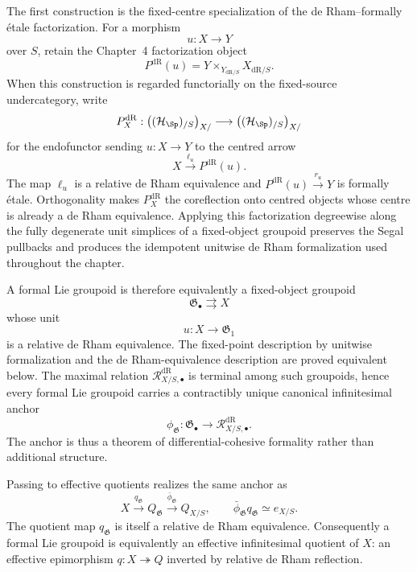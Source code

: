 The first construction is the fixed-centre specialization of the
de Rham--formally \'etale factorization.  For a morphism
\[
    u:X\longrightarrow Y
\]
over $S$, retain the Chapter~4 factorization object
\[
    P^{\mathrm{dR}}(u)
    =
    Y\times_{Y_{\mathrm{dR}/S}}X_{\mathrm{dR}/S}.
\]
When this construction is regarded functorially on the fixed-source
undercategory, write
\[
    P_X^{\mathrm{dR}}:
    \bigl((\mathcal H_{\Sp})_{/S}\bigr)_{X/}
    \longrightarrow
    \bigl((\mathcal H_{\Sp})_{/S}\bigr)_{X/}
\]
for the endofunctor sending \(u:X\to Y\) to the centred arrow
\[
    X\xrightarrow{\ell_u}P^{\mathrm{dR}}(u).
\]
The map \(\ell_u\) is a relative de Rham equivalence and
\(P^{\mathrm{dR}}(u)\xrightarrow{r_u}Y\) is formally
\'etale.  Orthogonality makes $P_X^{\mathrm{dR}}$ the
coreflection onto centred objects whose centre is already a de Rham
equivalence.  Applying this factorization degreewise along the fully
degenerate unit simplices of a fixed-object groupoid preserves the Segal
pullbacks and produces the idempotent unitwise de Rham formalization used
throughout the chapter.

A formal Lie groupoid is therefore equivalently a fixed-object groupoid
\[
    \mathfrak G_\bullet\rightrightarrows X
\]
whose unit
\[
    u:X\longrightarrow\mathfrak G_1
\]
is a relative de Rham equivalence.  The fixed-point description by unitwise
formalization and the de Rham-equivalence description are proved equivalent
below.  The maximal relation
$\mathcal R^{\mathrm{dR}}_{X/S,\bullet}$ is terminal among such groupoids, hence every
formal Lie groupoid carries a contractibly unique canonical infinitesimal
anchor
\[
    \phi_{\mathfrak G}:
    \mathfrak G_\bullet
    \longrightarrow
    \mathcal R^{\mathrm{dR}}_{X/S,\bullet}.
\]
The anchor is thus a theorem of differential-cohesive formality rather than
additional structure.

Passing to effective quotients realizes the same anchor as
\[
    X
    \xrightarrow{q_{\mathfrak G}}
    Q_{\mathfrak G}
    \xrightarrow{\bar\phi_{\mathfrak G}}
    Q_{X/S},
    \qquad
    \bar\phi_{\mathfrak G}q_{\mathfrak G}\simeq e_{X/S}.
\]
The quotient map $q_{\mathfrak G}$ is itself a relative de Rham equivalence.
Consequently a formal Lie groupoid is equivalently an effective infinitesimal
quotient of $X$: an effective epimorphism $q:X\twoheadrightarrow Q$ inverted
by relative de Rham reflection.

